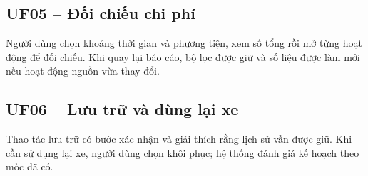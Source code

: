 \subsection{UF05 -- Đối chiếu chi phí}
Người dùng chọn khoảng thời gian và phương tiện, xem số tổng rồi mở từng hoạt động để đối chiếu. Khi quay lại báo cáo, bộ lọc được giữ và số liệu được làm mới nếu hoạt động nguồn vừa thay đổi.

\subsection{UF06 -- Lưu trữ và dùng lại xe}
Thao tác lưu trữ có bước xác nhận và giải thích rằng lịch sử vẫn được giữ. Khi cần sử dụng lại xe, người dùng chọn khôi phục; hệ thống đánh giá kế hoạch theo mốc đã có.
